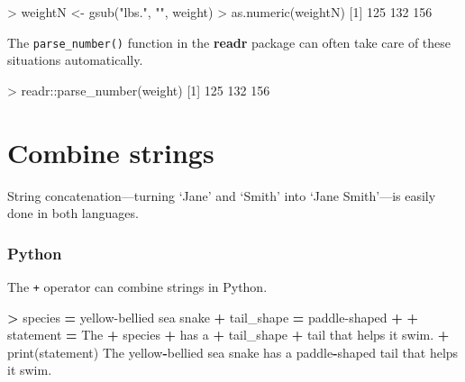 \documentclass[
]{book}
\newenvironment{Shaded}{\begin{snugshade}}{\end{snugshade}}
\newcommand{\BuiltInTok}[1]{#1}
\newcommand{\DecValTok}[1]{\textcolor[rgb]{0.00,0.00,0.81}{#1}}
\newcommand{\FunctionTok}[1]{\textcolor[rgb]{0.00,0.00,0.00}{#1}}
\newcommand{\NormalTok}[1]{#1}
\newcommand{\OperatorTok}[1]{\textcolor[rgb]{0.81,0.36,0.00}{\textbf{#1}}}
\newcommand{\OtherTok}[1]{\textcolor[rgb]{0.56,0.35,0.01}{#1}}
\newcommand{\SpecialCharTok}[1]{\textcolor[rgb]{0.00,0.00,0.00}{#1}}
\newcommand{\StringTok}[1]{\textcolor[rgb]{0.31,0.60,0.02}{#1}}
\begin{document}
\begin{Shaded}
\begin{Highlighting}[]
\SpecialCharTok{\textgreater{}}\NormalTok{ weightN }\OtherTok{\textless{}{-}} \FunctionTok{gsub}\NormalTok{(}\StringTok{"lbs."}\NormalTok{, }\StringTok{""}\NormalTok{, weight)}
\SpecialCharTok{\textgreater{}} \FunctionTok{as.numeric}\NormalTok{(weightN)}
\NormalTok{[}\DecValTok{1}\NormalTok{] }\DecValTok{125} \DecValTok{132} \DecValTok{156}
\end{Highlighting}
\end{Shaded}

The \texttt{parse\_number()} function in the \textbf{readr} package can often take care of these situations automatically.

\begin{Shaded}
\begin{Highlighting}[]
\SpecialCharTok{\textgreater{}}\NormalTok{ readr}\SpecialCharTok{::}\FunctionTok{parse\_number}\NormalTok{(weight)}
\NormalTok{[}\DecValTok{1}\NormalTok{] }\DecValTok{125} \DecValTok{132} \DecValTok{156}
\end{Highlighting}
\end{Shaded}

\hypertarget{combine-strings}{%
\section{Combine strings}\label{combine-strings}}

String concatenation---turning `Jane' and `Smith' into `Jane Smith'---is easily done in both languages.

\hypertarget{python-24}{%
\subsubsection*{Python}\label{python-24}}

The \texttt{+} operator can combine strings in Python.

\begin{Shaded}
\begin{Highlighting}[]
\OperatorTok{\textgreater{}}\NormalTok{ species }\OperatorTok{=} \StringTok{\textquotesingle{}yellow{-}bellied sea snake\textquotesingle{}}
\OperatorTok{+}\NormalTok{ tail\_shape }\OperatorTok{=} \StringTok{\textquotesingle{}paddle{-}shaped\textquotesingle{}}
\OperatorTok{+} 
\OperatorTok{+}\NormalTok{ statement }\OperatorTok{=} \StringTok{\textquotesingle{}The \textquotesingle{}} \OperatorTok{+}\NormalTok{ species }\OperatorTok{+} \StringTok{\textquotesingle{} has a \textquotesingle{}} \OperatorTok{+}\NormalTok{ tail\_shape }\OperatorTok{+} \StringTok{\textquotesingle{} tail that helps it swim.\textquotesingle{}}
\OperatorTok{+} \BuiltInTok{print}\NormalTok{(statement)}
\NormalTok{The yellow}\OperatorTok{{-}}\NormalTok{bellied sea snake has a paddle}\OperatorTok{{-}}\NormalTok{shaped tail that helps it swim.}
\end{Highlighting}
\end{Shaded}
\end{document}
